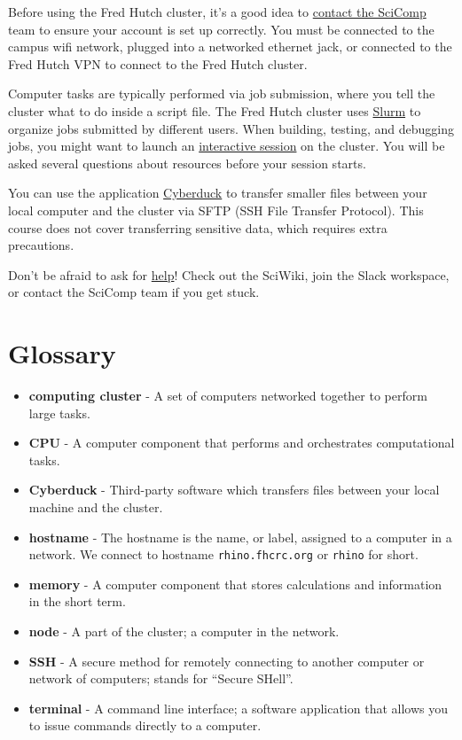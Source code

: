 \documentclass[
]{book}
\providecommand{\tightlist}{%
  \setlength{\itemsep}{0pt}\setlength{\parskip}{0pt}}
\begin{document}
Before using the Fred Hutch cluster, it's a good idea to \protect\hyperlink{account-setup}{contact the SciComp} team to ensure your account is set up correctly. You must be connected to the campus wifi network, plugged into a networked ethernet jack, or connected to the Fred Hutch VPN to connect to the Fred Hutch cluster.

Computer tasks are typically performed via job submission, where you tell the cluster what to do inside a script file. The Fred Hutch cluster uses \protect\hyperlink{submit-your-first-job}{Slurm} to organize jobs submitted by different users. When building, testing, and debugging jobs, you might want to launch an \protect\hyperlink{interactive-session}{interactive session} on the cluster. You will be asked several questions about resources before your session starts.

You can use the application \protect\hyperlink{file-upload-and-download}{Cyberduck} to transfer smaller files between your local computer and the cluster via SFTP (SSH File Transfer Protocol). This course does not cover transferring sensitive data, which requires extra precautions.

Don't be afraid to ask for \protect\hyperlink{help}{help}! Check out the SciWiki, join the Slack workspace, or contact the SciComp team if you get stuck.

\hypertarget{glossary}{%
\section{Glossary}\label{glossary}}

\begin{itemize}
\tightlist
\item
  \textbf{computing cluster} - A set of computers networked together to perform large tasks.
\item
  \textbf{CPU} - A computer component that performs and orchestrates computational tasks.
\item
  \textbf{Cyberduck} - Third-party software which transfers files between your local machine and the cluster.
\item
  \textbf{hostname} - The hostname is the name, or label, assigned to a computer in a network. We connect to hostname \texttt{rhino.fhcrc.org} or \texttt{rhino} for short.
\item
  \textbf{memory} - A computer component that stores calculations and information in the short term.
\item
  \textbf{node} - A part of the cluster; a computer in the network.
\item
  \textbf{SSH} - A secure method for remotely connecting to another computer or network of computers; stands for ``Secure SHell''.
\item
  \textbf{terminal} - A command line interface; a software application that allows you to issue commands directly to a computer.
\end{itemize}
\end{document}
